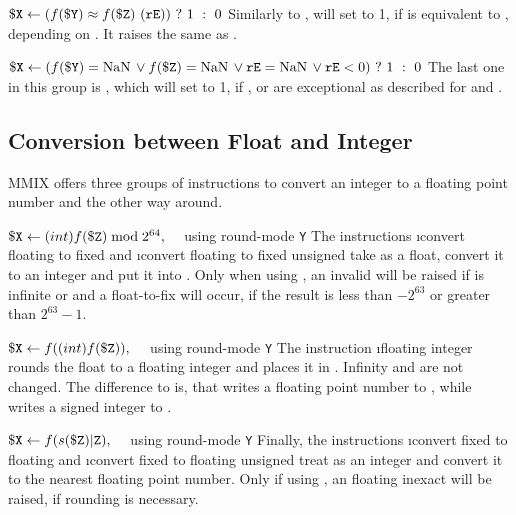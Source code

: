 \instrtbl
	{}
	{${\tt \$X} \leftarrow (f({\tt \$Y}) \approx f({\tt \$Z})~({\tt rE}))~?~1~:~0$}
\noindent Similarly to ,  will set  to 1, if  is equivalent to , depending on . It raises the same  as . \citep[pg. 19]{mmix-doc}

\instrtbl
	{}
	{${\tt \$X} \leftarrow (f({\tt \$Y}) = {\rm NaN}\, \lor f({\tt \$Z}) = {\rm NaN}\, \lor {\tt rE} = {\rm NaN}\, \lor {\tt rE} < 0)~?~1~:~0$}
\noindent The last one in this group is , which will set  to 1, if ,  or  are exceptional as described for  and . \citep[pg. 19]{mmix-doc}

\subsection{Conversion between Float and Integer}

MMIX offers three groups of instructions to convert an integer to a floating point number and the other way around.

\instrtbl
	{}
	{${\tt \$X} \leftarrow (int)f({\tt \$Z}) \bmod 2^{64},\quad$ using round-mode {\tt Y}}
\noindent The instructions \i{convert floating to fixed} and \i{convert floating to fixed unsigned} take  as a float, convert it to an integer and put it into . Only when using , an invalid  will be raised if  is infinite or \NaN and a float-to-fix  will occur, if the result is less than $-2^{63}$ or greater than $2^{63}-1$. \citep[pg. 20]{mmix-doc}

\instrtbl
	{}
	{${\tt \$X} \leftarrow f((int)f({\tt \$Z})),\quad$ using round-mode {\tt Y}}
\noindent The instruction \i{floating integer} rounds the float  to a floating integer and places it in . Infinity and \NaN are not changed. The difference to  is, that  writes a floating point number to , while  writes a signed integer to . \citep[pg. 17]{mmix-doc}

\instrtbl
	{}
	{${\tt \$X} \leftarrow f(s({\tt \$Z}){\tt|Z}),\quad$ using round-mode {\tt Y}}
\noindent Finally, the instructions \i{convert fixed to floating} and \i{convert fixed to floating unsigned} treat  as an integer and convert it to the nearest floating point number. Only if using , an floating inexact  will be raised, if rounding is necessary. \citep[pg. 20]{mmix-doc}

